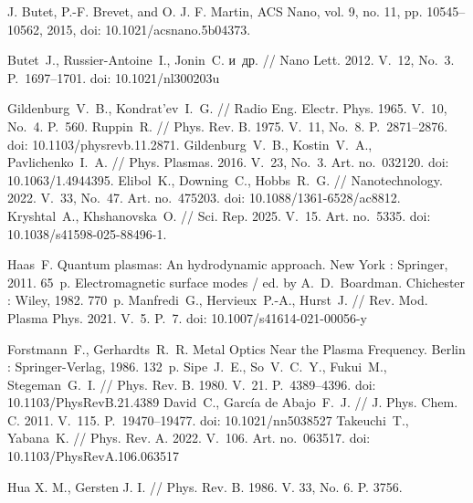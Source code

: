 \documentclass[12pt, a4paper]{article}
\begin{document}
\begin{thebibliography}{99}
J. Butet, P.-F. Brevet, and O. J. F. Martin, {ACS Nano}, vol. 9, no. 11, pp. 10545–10562, 2015, doi: 10.1021/acsnano.5b04373.

Butet~J., Russier-Antoine~I., Jonin~C. и~др. // Nano Lett. 2012. V.~12, No.~3. P.~1697--1701. doi: 10.1021/nl300203u

Gildenburg~V.~B., Kondrat’ev~I.~G. // Radio Eng. Electr. Phys. 1965. V.~10, No.~4. P.~560.
Ruppin~R. // Phys. Rev. B. 1975. V.~11, No.~8. P.~2871--2876. doi: 10.1103/physrevb.11.2871.
Gildenburg~V.~B., Kostin~V.~A., Pavlichenko~I.~A. // Phys. Plasmas. 2016. V.~23, No.~3. Art. no.~032120. doi: 10.1063/1.4944395.
Elibol~K., Downing~C., Hobbs~R.~G. // Nanotechnology. 2022. V.~33, No.~47. Art. no.~475203. doi: 10.1088/1361-6528/ac8812.
Kryshtal~A., Khshanovska~O. // Sci. Rep. 2025. V.~15. Art. no.~5335. doi: 10.1038/s41598-025-88496-1.

Haas~F. Quantum plasmas: An hydrodynamic approach. New York : Springer, 2011. 65~p.
Electromagnetic surface modes / ed. by A.~D.~Boardman. Chichester : Wiley, 1982. 770~p.
Manfredi~G., Hervieux~P.-A., Hurst~J. // Rev. Mod. Plasma Phys. 2021. V.~5. P.~7. 
doi: 10.1007/s41614-021-00056-y


Forstmann~F., Gerhardts~R.~R. Metal Optics Near the Plasma Frequency. Berlin : Springer-Verlag, 1986. 132~p.
Sipe~J.~E., So~V.~C.~Y., Fukui~M., Stegeman~G.~I. // Phys. Rev. B. 1980. V.~21. P.~4389--4396. doi: 10.1103/PhysRevB.21.4389
David~C., Garc\'{i}a de Abajo~F.~J. // J. Phys. Chem. C. 2011. V.~115. P.~19470--19477. doi: 10.1021/nn5038527
Takeuchi~T., Yabana~K. // Phys. Rev. A. 2022. V.~106. Art. no.~063517. doi: 10.1103/PhysRevA.106.063517

Hua X. M., Gersten J. I. // Phys. Rev. B. 1986. V. 33, No. 6. P. 3756.



\end{thebibliography}
\end{document}
